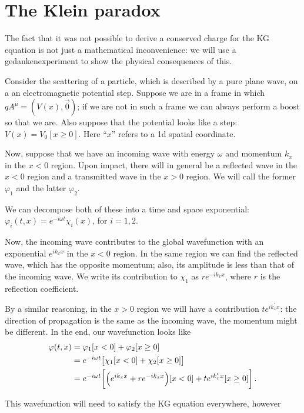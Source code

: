 \documentclass[main.tex]{subfiles}
\begin{document}
\section{The Klein paradox}


The fact that it was not possible to derive a conserved charge for the KG equation is not just a mathematical inconvenience: we will use a gedankenexperiment to show the physical consequences of this. 

Consider the scattering of a particle, which is described by a pure plane wave, on a an electromagnetic potential step.
Suppose we are in a frame in which \(qA^{\mu } = (V(x), \vec{0})\); if we are not in such a frame we can always perform a boost so that we are.
Also suppose that the potential looks like a step: \(V(x) = V_0 [x \geq 0]\). Here ``\(x\)'' refers to a 1d spatial coordinate. 

Now, suppose that we have an incoming wave with energy \(\omega \) and momentum \(k_{x}\) in the \(x<0\) region. 
Upon impact, there will in general be a reflected wave in the \(x<0\) region and a transmitted wave in the \(x>0\) region. We will call the former \(\varphi_{1}\) and the latter \(\varphi_{2}\). 

We can decompose both of these into a time and space exponential: \(\varphi_{i} (t, x) = e^{-i \omega t} \chi_{i}(x)\), for \(i = 1, 2\). 

Now, the incoming wave contributes to the global wavefunction with an exponential \(e^{ik_x x}\) in the \(x<0\) region. 
In the same region we can find the reflected wave, which has the opposite momentum; also, its amplitude is less than that of the incoming wave. We write its contribution to \(\chi_{1}\) as \(r e^{-i k_x x}\), where \(r\) is the reflection coefficient. 

By a similar reasoning, in the \(x>0\) region we will have a contribution \(t e^{i k_x^{\prime } x}\): the direction of propagation is the same as the incoming wave, the momentum might be different. In the end, our wavefunction looks like 
%
\begin{align}
\varphi (t, x) &= \varphi_1 [x<0] + \varphi_2 [x \geq 0] \\
&= e^{-i \omega t} \qty[\chi_1 [x<0] + \chi_2 [x \geq 0]] \\
&=
 e^{-i \omega t} \qty[ \qty(e^{i k_x x} + r e^{-i k_x x})[x<0] + t e^{i k_x^{\prime }x } [x\geq 0]]
\,.
\end{align}

This wavefunction will need to satisfy the KG equation everywhere, however 
\end{document}
